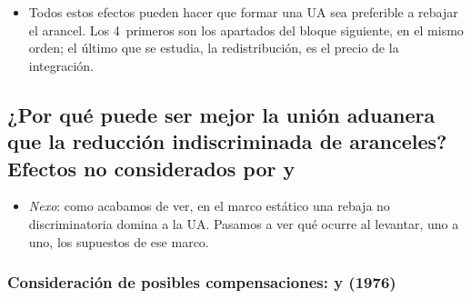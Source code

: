 \documentclass[11pt]{article}
\begin{document}
\begin{itemize}
\item Todos estos efectos pueden hacer que formar una UA sea preferible a rebajar el arancel. Los 4~primeros son los apartados del bloque siguiente, en el mismo orden; el último que se estudia, la redistribución, es el precio de la integración.
\end{itemize}

\subsection{¿Por qué puede ser mejor la unión aduanera que la reducción indiscriminada de aranceles?\cortetitulo{} Efectos no considerados por  y }\label{sec:mejor-ua}

\begin{itemize}
\item \emph{Nexo}: como acabamos de ver, en el marco estático una rebaja no discriminatoria domina a la UA. Pasamos a ver qué ocurre al levantar, uno a uno, los supuestos de ese marco.
\end{itemize}

\subsubsection{Consideración de posibles compensaciones:  y  (1976)}\label{sec:kemp-wan}
\end{document}
